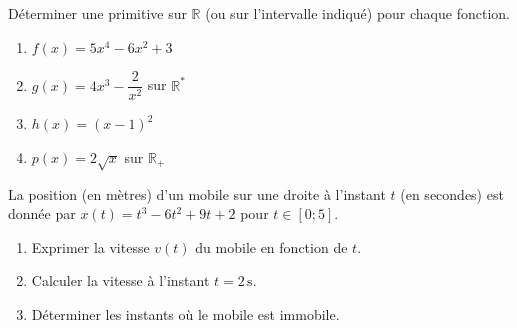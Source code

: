 \documentclass[11pt]{article}
\begin{document}
\begin{exercice}
Déterminer une primitive sur $\mathbb{R}$ (ou sur l'intervalle indiqué) pour chaque fonction.
\begin{enumerate}
    \item $f(x) = 5x^4 - 6x^2 + 3$
    \item $g(x) = 4x^3 - \dfrac{2}{x^2}$ sur $\mathbb{R}^*$
    \item $h(x) = (x-1)^2$
    \item $p(x) = 2\sqrt{x}$ sur $\mathbb{R}_+$
\end{enumerate}
\end{exercice}

\begin{exercice}
La position (en mètres) d'un mobile sur une droite à l'instant $t$ (en secondes) est donnée par $x(t) = t^3 - 6t^2 + 9t + 2$ pour $t \in [0; 5]$.
\begin{enumerate}
    \item Exprimer la vitesse $v(t)$ du mobile en fonction de $t$.
    \item Calculer la vitesse à l'instant $t = 2\,\text{s}$.
    \item Déterminer les instants où le mobile est immobile.
\end{enumerate}
\end{exercice}
\end{document}
